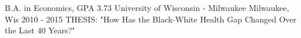 

\begin{cventries}

  \cventry
    {B.A. in Economics, GPA 3.73} %
    {University of Wisconsin - Milwaukee} %
    {Milwaukee, Wis} %
    {2010 - 2015} %
    {THESIS: "How Has the Black-White Health Gap Changed Over the Last 40 Years?"}
    

\end{cventries}
